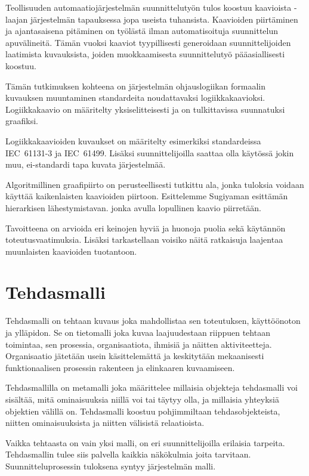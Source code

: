 \documentclass[finnish,12pt]{article}
\begin{document}
Teollisuuden automaatiojärjestelmän suunnittelutyön tulos koostuu kaavioista - laajan järjestelmän tapauksessa jopa useista tuhansista. 
Kaavioiden piirtäminen ja ajantasaisena pitäminen on työlästä ilman automatisoituja suunnittelun apuvälineitä.
Tämän vuoksi kaaviot tyypillisesti generoidaan suunnittelijoiden laatimista kuvauksista, joiden muokkaamisesta suunnittelutyö pääasiallisesti koostuu.

Tämän tutkimuksen kohteena on järjestelmän ohjauslogiikan formaalin kuvauksen muuntaminen standardeita noudattavaksi logiikkakaavioksi.
Logiikkakaavio on määritelty yksiselitteisesti ja on tulkittavissa suunnatuksi graafiksi.

Logiikkakaavioiden kuvaukset on määritelty esimerkiksi standardeissa IEC~61131-3 ja IEC~61499.
Lisäksi suunnittelijoilla saattaa olla käytössä jokin muu, ei-standardi tapa kuvata järjestelmää.

Algoritmillinen graafipiirto on perusteellisesti tutkittu ala, jonka tuloksia voidaan käyttää kaikenlaisten kaavioiden piirtoon.
Esittelemme Sugiyaman esittämän hierarkisen lähestymistavan. jonka avulla lopullinen kaavio piirretään.

Tavoitteena on arvioida eri keinojen hyviä ja huonoja puolia sekä käytännön toteutusvaatimuksia.
Lisäksi tarkastellaan voisiko näitä ratkaisuja laajentaa muunlaisten kaavioiden tuotantoon.

	\clearpage
	\section{Tehdasmalli}

Tehdasmalli on tehtaan kuvaus joka mahdollistaa sen toteutuksen, käyttöönoton ja ylläpidon.
Se on tietomalli joka kuvaa laajuudestaan riippuen tehtaan toimintaa, sen prosessia, organisaatiota, ihmisiä ja näitten aktiviteetteja.
Organisaatio jätetään usein käsittelemättä ja keskitytään mekaanisesti funktionaalisen prosessin rakenteen ja elinkaaren kuvaamiseen.

Tehdasmallilla on metamalli joka määrittelee millaisia objekteja tehdasmalli voi sisältää, mitä ominaisuuksia niillä voi tai täytyy olla, ja millaisia yhteyksiä objektien välillä on.
Tehdasmalli koostuu pohjimmiltaan tehdasobjekteista, niitten ominaisuuksista ja niitten välisistä relaatioista. 

Vaikka tehtaasta on vain yksi malli, on eri suunnittelijoilla erilaisia tarpeita.
Tehdasmallin tulee siis palvella kaikkia näkökulmia joita tarvitaan.  
Suunnitteluprosessin tuloksena syntyy järjestelmän malli.
\end{document}
